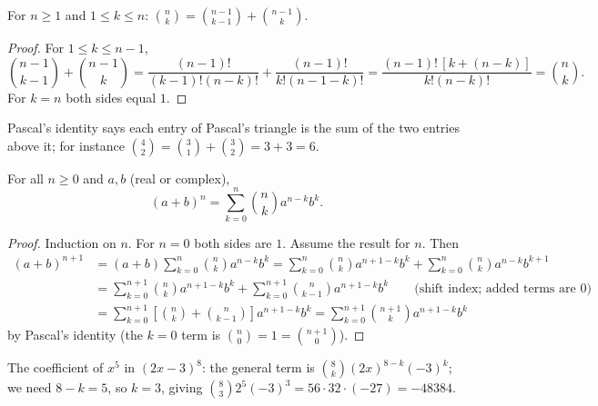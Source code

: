 \begin{lemma}
For $n \geq 1$ and $1 \leq k \leq n$: $\binom{n}{k} = \binom{n-1}{k-1} + \binom{n-1}{k}$.
\end{lemma}
\begin{proof}
For $1 \le k \le n-1$,
\[
\binom{n-1}{k-1} + \binom{n-1}{k} = \frac{(n-1)!}{(k-1)!(n-k)!} + \frac{(n-1)!}{k!(n-1-k)!}
= \frac{(n-1)!\,[k + (n-k)]}{k!(n-k)!} = \binom nk .
\]
For $k = n$ both sides equal $1$.
\end{proof}

Pascal's identity says each entry of Pascal's triangle is the sum of the two entries above
it; for instance $\binom 42 = \binom 31 + \binom 32 = 3 + 3 = 6$.
\begin{center}
\end{center}

\begin{theorem}
For all $n \ge 0$ and $a,b$ (real or complex),
\[ (a+b)^n = \sum_{k=0}^n \binom nk a^{n-k} b^k. \]
\end{theorem}
\begin{proof}
Induction on $n$. For $n = 0$ both sides are $1$. Assume the result for $n$. Then
\begin{align*}
(a+b)^{n+1} &= (a+b)\sum_{k=0}^n\binom nk a^{n-k}b^k
 = \sum_{k=0}^n\binom nk a^{n+1-k}b^k + \sum_{k=0}^{n}\binom nk a^{n-k}b^{k+1}\\
&= \sum_{k=0}^{n+1}\binom nk a^{n+1-k}b^k + \sum_{k=0}^{n+1}\binom n{k-1}a^{n+1-k}b^k
 \qquad\text{(shift index; added terms are $0$)}\\
&= \sum_{k=0}^{n+1}\left[\binom nk + \binom n{k-1}\right]a^{n+1-k}b^k
 = \sum_{k=0}^{n+1}\binom{n+1}k a^{n+1-k}b^k
\end{align*}
by Pascal's identity (the $k=0$ term is $\binom n0 = 1 = \binom{n+1}0$).
\end{proof}

\begin{example}
The coefficient of $x^5$ in $(2x - 3)^8$: the general term is $\binom 8k (2x)^{8-k}(-3)^k$;
we need $8 - k = 5$, so $k = 3$, giving $\binom83 2^5 (-3)^3 = 56\cdot 32\cdot(-27) = -48384$.
\end{example}


